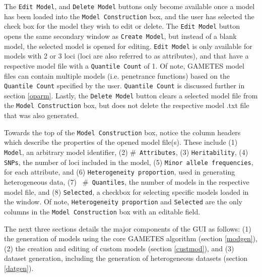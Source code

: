 \documentclass{report}
\begin{document}
The \texttt{Edit Model}, and \texttt{Delete Model} buttons only become available once a model has been loaded into the \texttt{Model Construction} box, and the user has selected the check box for the model they wish to edit or delete.  The \texttt{Edit Model} button opens the same secondary window as \texttt{Create Model}, but instead of a blank model, the selected model is opened for editing.  \texttt{Edit Model} is only available for models with 2 or 3 loci (loci are also referred to as attributes), and that have a respective model file with a \texttt{Quantile Count} of 1.  Of note, GAMETES model files can contain multiple models (i.e. penetrance functions) based on the \texttt{Quantile Count} specified by the user. \texttt{Quantile Count} is discussed further in section \ref{oparm}.  Lastly, the \texttt{Delete Model} button clears a selected model file from the \texttt{Model Construction} box, but does not delete the respective model .txt file that was also generated.  

Towards the top of the \texttt{Model Construction} box, notice the column headers which describe the properties of the opened model file(s).  These include (1) \texttt{Model}, an arbitrary model identifier, (2) \texttt{$\#$ Attributes}, (3) \texttt{Heritability}, (4) \texttt{SNPs}, the number of loci included in the model, (5) \texttt{Minor allele frequencies}, for each attribute, and (6) \texttt{Heterogeneity proportion}, used in generating heterogeneous data, (7) \texttt{ $\#$ Quantiles}, the number of models in the respective model file,  and (8) \texttt{Selected}, a checkbox for selecting specific models loaded in the window.  Of note, \texttt{Heterogeneity proportion} and \texttt{Selected} are the only columns in the \texttt{Model Construction} box with an editable field.

The next three sections details the major components of the GUI as follows: (1) the generation of models using the core GAMETES algorithm (section \ref{modgen}), (2) the creation and editing of custom models (section \ref{custmod}), and (3) dataset generation, including the generation of heterogeneous datasets (section \ref{datgen}).
\end{document}
